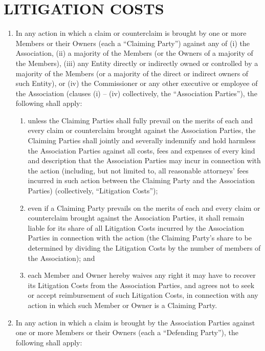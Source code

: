 \documentclass[]{book}
\providecommand{\tightlist}{%
  \setlength{\itemsep}{0pt}\setlength{\parskip}{0pt}}
\theoremstyle{definition}
\theoremstyle{definition}
\theoremstyle{definition}
\theoremstyle{remark}
\begin{document}
\section{LITIGATION COSTS}\label{litigation-costs}

\begin{enumerate}
\def\labelenumi{(\alph{enumi})}
\tightlist
\item
  In any action in which a claim or counterclaim is brought by one or
  more Members or their Owners (each a ``Claiming Party'') against any
  of (i) the Association, (ii) a majority of the Members (or the Owners
  of a majority of the Members), (iii) any Entity directly or indirectly
  owned or controlled by a majority of the Members (or a majority of the
  direct or indirect owners of such Entity), or (iv) the Commissioner or
  any other executive or employee of the Association (clauses (i) --
  (iv) collectively, the ``Association Parties''), the following shall
  apply:

  \begin{enumerate}
  \def\labelenumii{(\roman{enumii})}
  \tightlist
  \item
    unless the Claiming Parties shall fully prevail on the merits of
    each and every claim or counterclaim brought against the Association
    Parties, the Claiming Parties shall jointly and severally indemnify
    and hold harmless the Association Parties against all costs, fees
    and expenses of every kind and description that the Association
    Parties may incur in connection with the action (including, but not
    limited to, all reasonable attorneys' fees incurred in such action
    between the Claiming Party and the Association Parties)
    (collectively, ``Litigation Costs'');
  \item
    even if a Claiming Party prevails on the merits of each and every
    claim or counterclaim brought against the Association Parties, it
    shall remain liable for its share of all Litigation Costs incurred
    by the Association Parties in connection with the action (the
    Claiming Party's share to be determined by dividing the Litigation
    Costs by the number of members of the Association); and
  \item
    each Member and Owner hereby waives any right it may have to recover
    its Litigation Costs from the Association Parties, and agrees not to
    seek or accept reimbursement of such Litigation Costs, in connection
    with any action in which such Member or Owner is a Claiming Party.
  \end{enumerate}
\item
  In any action in which a claim is brought by the Association Parties
  against one or more Members or their Owners (each a ``Defending
  Party''), the following shall apply:


\end{enumerate}
\end{document}
